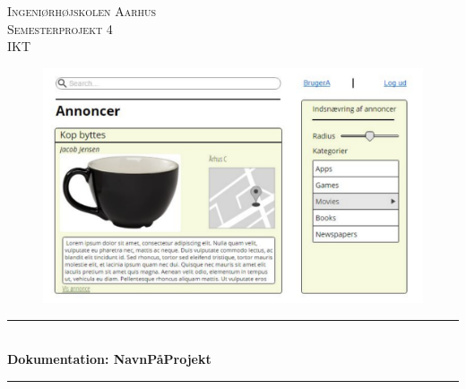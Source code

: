 \begin{titlepage}
		
		\newcommand{\HRule}{\rule{\linewidth}{0.5mm}} %
		
		\center %
		
		
		\textsc{\LARGE Ingeniørhøjskolen Aarhus}\\[1cm] %
		\textsc{\Large Semesterprojekt 4}\\[0.5cm] %
		\textsc{\large IKT}\\[0.5cm] %
		
		\begin{figure}[ht!]
			\centering
			\includegraphics[width=120mm]{figures/forside.pdf}
		\end{figure}
		
		
		\HRule \\[0.4cm]
		{ \huge \bfseries Dokumentation: NavnPåProjekt}\\[0.4cm] %
		\HRule \\[1.2cm]
		
		

\end{titlepage}
